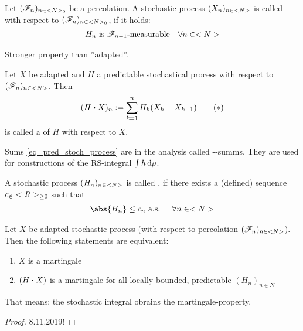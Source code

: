 \begin{*definition}[predictable]
	Let $(\mathscr F_n)_{n\in <N>_0}$ be a percolation. A stochastic process $(X_n)_{n \in <N>}$ is called  with respect to $(\mathscr F_n)_{n \in <N>_0}$, if it holds:
	\begin{align*}
		H_n \text{ is } \mathscr F_{n-1}\text{-measurable} \quad \forall n \in <N>
	\end{align*}
\end{*definition}
\begin{*remark}
	Stronger property than ''adapted''.
\end{*remark}
\begin{*definition}
	Let $X$ be adapted and $H$ a predictable stochastical process with respect to $(\mathscr F_n)_{n \in <N>}$. Then
	\begin{align*}
		(H \boldsymbol{\cdot} X)_n := \sum_{k=1}^n H_k (X_k - X_{k-1}) \tag{$\ast$}\label{eq_pred_stoch_process}
	\end{align*}
	is called a  of $H$ with respect to $X$.
\end{*definition}
\begin{*remark}
	Sums \eqref{eq_pred_stoch_process} are in the analysis called --summs. They are used for constructions of the RS-integral $\int h \,\mathrm{d} \rho$.
\end{*remark}
\begin{*definition}
	A stochastic process $(H_n)_{n \in <N>}$ is called , if there exists a (defined) sequence $c_ \in <R>_{\ge 0}$  
	such that
	\begin{align*}
		\abs{H_n} \le c_n \text{ a.s. } \quad \forall n \in \N
	\end{align*}
\end{*definition}
\begin{theorem}
	Let $X$ be adapted stochastic process (with respect to percolation $(\mathscr F_n)_{n \in <N>}$). Then the following statements are equivalent:
	\begin{enumerate}
		\item $X$ is a martingale
		\item $(H \boldsymbol{\cdot} X)$ is a martingale for all locally bounded, predictable $(H_n)_{n \in N}$
	\end{enumerate}
	That means: the stochastic integral obrains the martingale-property.
\end{theorem}
\begin{proof}
	8.11.2019!
\end{proof}
